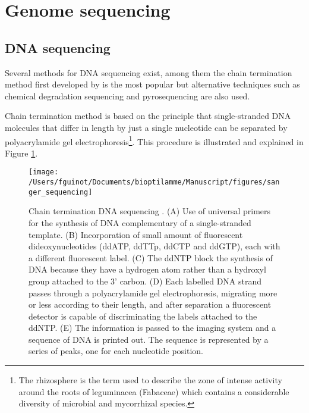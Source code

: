 \documentclass[]{book}
\let\rmarkdownfootnote\footnote%
\def\footnote{\protect\rmarkdownfootnote}
\begin{document}
\hypertarget{genome-sequencing}{%
\section{Genome sequencing}\label{genome-sequencing}}

\hypertarget{DNAseq}{%
\subsection{DNA sequencing}\label{DNAseq}}

Several methods for DNA sequencing exist, among them the chain
termination method first developed by \citep{sanger1977dna} is the most
popular but alternative techniques such as chemical degradation
sequencing \citep{maxam1977new} and pyrosequencing \citep{nyren1993solid} are also
used.

Chain termination method is based on the principle that single-stranded
DNA molecules that differ in length by just a single nucleotide can be
separated by polyacrylamide gel electrophoresis\footnote{The rhizosphere is the term used to describe the zone of intense
  activity around the roots of leguminacea (Fabaceae) which contains a
  considerable diversity of microbial and mycorrhizal species.}. This procedure is
illustrated and explained in Figure \ref{fig:sanger}.



\begin{figure}

{\centering \texttt{[image: /Users/fguinot/Documents/bioptilamme/Manuscript/figures/sanger\_sequencing]} 

}

\caption{Chain termination DNA sequencing \citep{brown2007genomes}. (A) Use of universal primers for the synthesis of DNA complementary of a single-stranded template. (B) Incorporation of small amount of fluorescent dideoxynucleotides (ddATP, ddTTp, ddCTP and ddGTP), each with a different fluorescent label. (C) The ddNTP block the synthesis of DNA because they have a hydrogen atom rather than a hydroxyl group attached to the 3' carbon. (D) Each labelled DNA strand passes through a polyacrylamide gel electrophoresis, migrating more or less according to their length, and after separation a fluorescent detector is capable of discriminating the labels attached to the ddNTP. (E) The information is passed to the imaging system and a sequence of DNA is printed out. The sequence is represented by a series of peaks, one for each nucleotide position.}\label{fig:sanger}
\end{figure}
\end{document}
